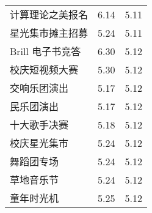 \documentclass[letterpaper, 12pt]{article}
\begin{document}
\begin{multicols}{2}
{\begin{longtable}{|>{\centering\arraybackslash}m{}|m{}|m{}|}
    计算理论之美报名 & 6.14 & 5.11\\
    星光集市摊主招募 & 5.24 & 5.11\\
    Brill 电子书竞答 & 6.30 & 5.12\\
    校庆短视频大赛 & 5.30 & 5.12\\
    交响乐团演出 & 5.17 & 5.12\\
    民乐团演出 & 5.17 & 5.12\\
    十大歌手决赛 & 5.18 & 5.12\\
    校庆星光集市 & 5.24 & 5.12\\
    舞蹈团专场 & 5.24 & 5.12\\
    草地音乐节 & 5.24 & 5.12\\
    童年时光机 & 5.25 & 5.12\\
    \hline
\end{longtable}
\unskip
\unpenalty
\unpenalty}\unvbox\colbbox
\end{multicols}
\end{document}

